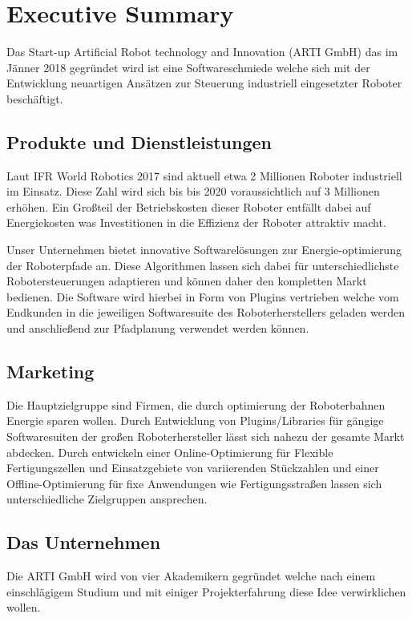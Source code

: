 \chapter{Executive Summary}

Das Start-up Artificial Robot technology and Innovation (ARTI GmbH) das im Jänner 2018 gegründet wird ist eine Softwareschmiede welche sich mit der Entwicklung neuartigen Ansätzen zur Steuerung industriell eingesetzter Roboter beschäftigt.

\section{Produkte und Dienstleistungen}

Laut IFR World Robotics 2017 sind aktuell etwa 2 Millionen Roboter industriell im Einsatz. Diese Zahl wird sich bis bis 2020 voraussichtlich auf 3 Millionen erhöhen. Ein Großteil der Betriebskosten dieser Roboter entfällt dabei auf Energiekosten was Investitionen in die Effizienz der Roboter attraktiv macht.

Unser Unternehmen bietet innovative Softwarelösungen zur Energie-optimierung der Roboterpfade an. Diese Algorithmen lassen sich dabei für unterschiedlichste Robotersteuerungen adaptieren und können daher den kompletten Markt bedienen. Die Software wird hierbei in Form von Plugins vertrieben welche vom Endkunden in die jeweiligen Softwaresuite des Roboterherstellers geladen werden und anschließend zur Pfadplanung verwendet werden können.

\section{Marketing}

Die Hauptzielgruppe sind Firmen, die durch optimierung der Roboterbahnen Energie sparen wollen. Durch Entwicklung von Plugins/Libraries für gängige Softwaresuiten der großen Roboterhersteller lässt sich nahezu der gesamte Markt abdecken. Durch entwickeln einer Online-Optimierung für Flexible Fertigungszellen und Einsatzgebiete von variierenden Stückzahlen und einer Offline-Optimierung für fixe Anwendungen wie Fertigungsstraßen lassen sich unterschiedliche Zielgruppen ansprechen.

\section{Das Unternehmen}

Die ARTI GmbH wird von vier Akademikern gegründet welche nach einem einschlägigem Studium und mit einiger Projekterfahrung diese Idee verwirklichen wollen.

